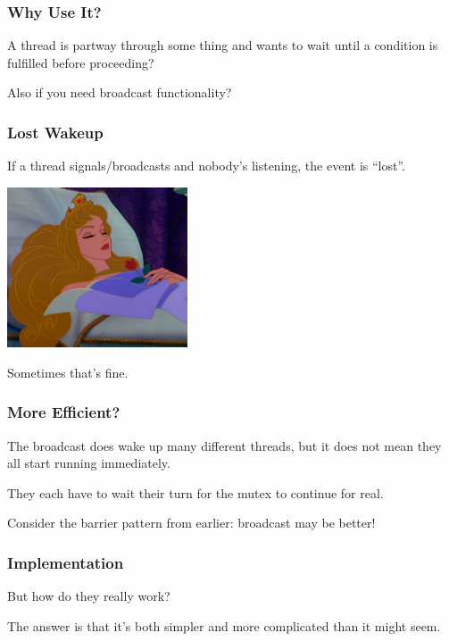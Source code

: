 \begin{frame}
\frametitle{Why Use It?}

A thread is partway through some thing and wants to wait until a condition is fulfilled before proceeding?

Also if you need broadcast functionality?

\end{frame}

\begin{frame}
\frametitle{Lost Wakeup}

If a thread signals/broadcasts and nobody's listening, the event is ``lost''.

\begin{center}
	\includegraphics[width=0.4\textwidth]{images/sleepingbeauty.jpg}
\end{center}

Sometimes that's fine.

\end{frame}

\begin{frame}
\frametitle{More Efficient?}

The broadcast does wake up many different threads, but it does not mean they all start running immediately. 

They each have to wait their turn for the mutex to continue for real.

Consider the barrier pattern from earlier: broadcast may be better!

\end{frame}

\begin{frame}
\frametitle{Implementation}

But how do they really work? 

The answer is that it's both simpler and more complicated than it might seem. 

\end{frame}



